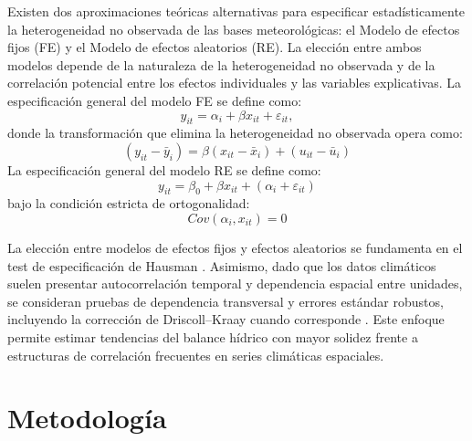 \documentclass[11pt,a4paper]{article}
\begin{document}
Existen dos aproximaciones teóricas alternativas para especificar estadísticamente la heterogeneidad no observada de las bases meteorológicas: el Modelo de efectos fijos (FE) y el Modelo de efectos aleatorios (RE). La elección entre ambos modelos depende de la naturaleza de la heterogeneidad no observada y de la correlación potencial entre los efectos individuales y las variables explicativas. La especificación general del modelo FE se define como:
\begin{equation}
    y_{it} = \alpha_i + \beta x_{it} + \varepsilon_{it},
\end{equation}
donde la transformación que elimina la heterogeneidad no observada opera como:
\begin{equation}
    (y_{it} - \bar{y}_i) = \beta(x_{it} - \bar{x}_i) + (u_{it} - \bar{u}_i)
\end{equation}
La especificación general del modelo RE se define como:
\begin{equation}
    y_{it} = \beta_0 + \beta x_{it} + (\alpha_i + \varepsilon_{it})
\end{equation}
bajo la condición estricta de ortogonalidad:
\begin{equation}
    Cov(\alpha_i, x_{it}) = 0
\end{equation}

La elección entre modelos de efectos fijos y efectos aleatorios se fundamenta en el test de especificación de Hausman \citep{hausman1978,wooldridge2010}. Asimismo, dado que los datos climáticos suelen presentar autocorrelación temporal y dependencia espacial entre unidades, se consideran pruebas de dependencia transversal y errores estándar robustos, incluyendo la corrección de Driscoll--Kraay cuando corresponde \citep{pesaran2004}. Este enfoque permite estimar tendencias del balance hídrico con mayor solidez frente a estructuras de correlación frecuentes en series climáticas espaciales.


\section{Metodología}
\end{document}
